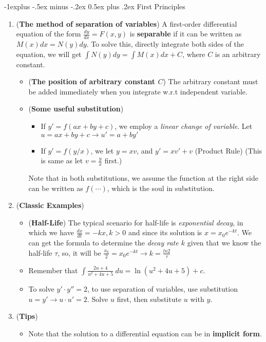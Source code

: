 \documentclass[10pt, landscape]{article}
\makeatletter
\renewcommand{\subsection}{\@startsection{subsection}{2}{0mm}%
                                {-1explus -.5ex minus -.2ex}%
                                {0.5ex plus .2ex}%
                                {\normalfont\normalsize\bfseries}}
\makeatother
\begin{document}
\begin{multicols}{4}
\subsection{First Principles}
\begin{enumerate}
    \item (\textbf{The method of separation of variables}) A first-order differential equation of the form $\frac{dy}{dx}=F(x,y)$ is \textbf{separable} if it can be written as $M(x)dx=N(y)dy$. To solve this, directly integrate both sides of the equation, we will get $\int N(y)dy=\int M(x)dx+C$, where $C$ is an arbitrary constant.
    \begin{itemize}
        \item (\textbf{The position of arbitrary constant $C$}) The arbitrary constant must be added immediately when you integrate w.r.t independent variable.
        \item (\textbf{Some useful substitution})
        \begin{itemize}
            \item If $y'=f(ax+by+c)$, we employ a \textit{linear change of variable}. Let $u=ax+by+c\rightarrow u'=a+by'$
            \item If $y'=f(y/x)$, we let $y=xv$, and $y'=xv'+v$ (Product Rule) (This is same as let $v=\frac{y}{x}$ first.)
        \end{itemize}
        Note that in both substitutions, we assume the function at the right side can be written as $f(\cdots)$, which is the soul in substitution.
    \end{itemize}
    \item (\textbf{Classic Examples})
    \begin{itemize}
        \item (\textbf{Half-Life}) The typical scenario for half-life is \textit{exponential decay}, in which we have $\frac{dx}{dt}=-kx,k>0$ and since its solution is $x=x_0e^{-kt}$. We can get the formula to determine the \textit{decay rate $k$} given that we know the half-life $\tau$, so, it will be $\frac{x_0}{2}=x_0e^{-kt}\rightarrow k=\frac{ln2}{\tau}$
        \item Remember that $\int\frac{2u+4}{u^2+4u+5}~du=\ln(u^2+4u+5)+c$.
        \item To solve $y'\cdot y''=2$, to use separation of variables, use substitution $u=y'\rightarrow u\cdot u'=2$. Solve $u$ first, then substitute $u$ with $y$.
    \end{itemize}
    \item (\textbf{Tips})
    \begin{itemize}
        \item Note that the solution to a differential equation can be in \textbf{implicit form}.
    \end{itemize}
\end{enumerate}

\end{multicols}
\end{document}
